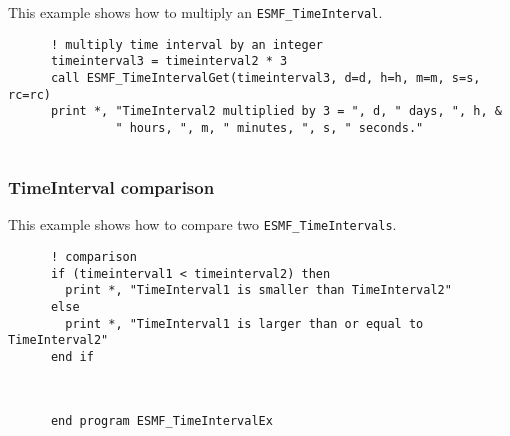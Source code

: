    This example shows how to multiply an {\tt ESMF\_TimeInterval}.  

 \begin{verbatim}
      ! multiply time interval by an integer
      timeinterval3 = timeinterval2 * 3
      call ESMF_TimeIntervalGet(timeinterval3, d=d, h=h, m=m, s=s, rc=rc)
      print *, "TimeInterval2 multiplied by 3 = ", d, " days, ", h, &
               " hours, ", m, " minutes, ", s, " seconds."
 
\end{verbatim}
 

  \subsubsection{TimeInterval comparison}
 
   This example shows how to compare two {\tt ESMF\_TimeIntervals}.  

 \begin{verbatim}
      ! comparison
      if (timeinterval1 < timeinterval2) then
        print *, "TimeInterval1 is smaller than TimeInterval2"
      else 
        print *, "TimeInterval1 is larger than or equal to TimeInterval2"
      end if

 
\end{verbatim}
 

 \begin{verbatim}
      end program ESMF_TimeIntervalEx
 
\end{verbatim}

\setlength{\parskip}{\oldparskip}
\setlength{\parindent}{\oldparindent}
\setlength{\baselineskip}{\oldbaselineskip}
